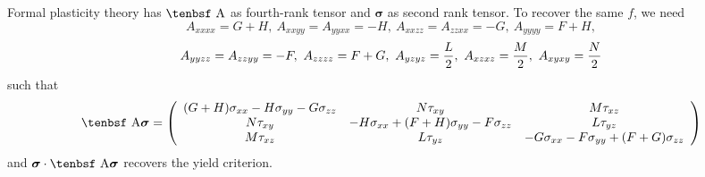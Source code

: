 \documentclass[11pt]{book}
\renewcommand{\vec}[1]{\boldsymbol{#1}}
\def\A{\hbox{\tenbsf A}}
\def\s#1{\sigma_{#1}}
\def\t#1{\tau_{#1}}
\begin{document}
Formal plasticity theory has $\A$ as fourth-rank tensor and $\vec\sigma$ as second rank tensor. To recover the same $f$, we need
\begin{equation}
  A_{xxxx} = G + H, \  A_{xxyy} = A_{yyxx} = -H, \  A_{xxzz}=A_{zzxx} = -G, \    A_{yyyy} = F+H, 
\end{equation}
\begin{equation}
  A_{yyzz} = A_{zzyy} = -F, \  A_{zzzz} = F+G, \ A_{yzyz} = {L\over 2}, \ A_{xzxz} = {M\over 2}, \ A_{xyxy} = {N\over 2}
\end{equation}
such that
\begin{equation}
      \A\vec\sigma = \left( \begin{array}{ccc}
                       (G+H)\s{xx}-H\s{yy}-G\s{zz} & N\t{xy} & M\t{xz}  \\
                       N\t{xy} & -H\s{xx} +(F+H)\s{yy} -F\s{zz} & L\t{yz} \\
                       M\t{xz} &  L\t{yz} & -G\s{xx} -F\s{yy} + (F+G)\s{zz}
                         \end{array} \right)
\end{equation}
and ${\vec\sigma} \cdot \A {\vec\sigma}$ recovers the yield criterion.
\end{document}
